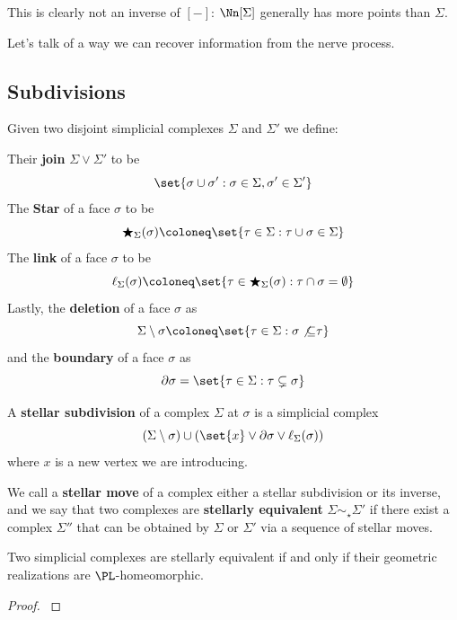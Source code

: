 This is clearly not an inverse of $[-]$: $\Nn[\Sigma]$ generally has more points than $\Sigma$.

Let's talk of a way we can recover information from the nerve process.

\subsection{Subdivisions}
\begin{definition}\hfill 

    Given two disjoint simplicial complexes $\Sigma$ and $\Sigma'$ we define:
    
    \noindent Their \textbf{join} $\Sigma\vee\Sigma'$ to be 
    \[\set{\sigma\cup\sigma': \sigma\in\Sigma,\sigma'\in\Sigma'}\]
    The \textbf{Star} of a face $\sigma$ to be 
    \[\bigstar_\Sigma(\sigma)\coloneq\set{\tau\in\Sigma:\tau\cup\sigma\in\Sigma}\]
    The \textbf{link} of a face $\sigma$ to be 
    \[\ell_\Sigma(\sigma)\coloneq \set{\tau\in\bigstar_\Sigma(\sigma): \tau\cap\sigma=\emptyset}\]
    Lastly, the \textbf{deletion} of a face $\sigma$ as 
    \[\Sigma\setminus\sigma\coloneq \set{\tau\in\Sigma: \sigma\not{\subseteq}\tau}\]
    and the \textbf{boundary} of a face $\sigma$ as 
    \[\partial\sigma=\set{\tau\in \Sigma: \tau\subsetneq \sigma}\]
    
    \noindent A \textbf{stellar subdivision} of a complex $\Sigma$ at $\sigma$ is a simplicial complex 
    \[(\Sigma\setminus\sigma) \cup (\set{x}\vee\partial \sigma\vee \ell_\Sigma(\sigma))\]
    where $x$ is a new vertex we are introducing.
    
    We call a \textbf{stellar move} of a complex either a stellar subdivision or its inverse, and we say that 
    two complexes are \textbf{stellarly equivalent} $\Sigma\sim_\star\Sigma'$ if there exist a complex $\Sigma''$ that can be obtained
    by $\Sigma$ or $\Sigma'$ via a sequence of stellar moves.
    \end{definition}
    
    \begin{theorem}[Alexander]\hfill 
    
    Two simplicial complexes are stellarly equivalent if and only if their geometric realizations are $\PL$-homeomorphic.    
    \end{theorem}
    \begin{proof}
        \cite{PLTopology}
    \end{proof}

